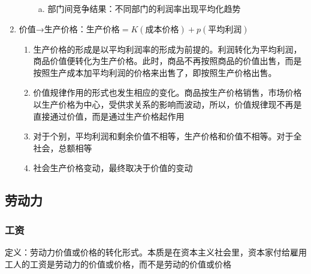 \documentclass[12pt]{book}
\begin{document}
\begin{enumerate}[1.]
\begin{enumerate}[(1)]
\begin{enumerate}[a.]
                        \item 部门间竞争结果：不同部门的利润率出现平均化趋势
                    \end{enumerate}
          \end{enumerate}
    \item 价值→生产价格：$\text{生产价格}=K(\text{成本价格})+p(\text{平均利润})$
          \begin{enumerate}[(1)]
              \item 生产价格的形成是以平均利润率的形成为前提的。利润转化为平均利润，商品价值便转化为生产价格。此时，商品不再按照商品的价值出售，而是按照生产成本加平均利润的价格来出售了，即按照生产价格出售。
              \item 价值规律作用的形式也发生相应的变化。商品按生产价格销售，市场价格以生产价格为中心，受供求关系的影响而波动，所以，价值规律现不再是直接通过价值，而是通过生产价格起作用
              \item  对于个别，平均利润和剩余价值不相等，生产价格和价值不相等。对于全社会，总额相等
              \item 社会生产价格变动，最终取决于价值的变动
          \end{enumerate}
\end{enumerate}






\subsection{劳动力}









\subsubsection{工资}
定义：劳动力价值或价格的转化形式。本质是在资本主义社会里，资本家付给雇用工人的工资是劳动力的价值或价格，而不是劳动的价值或价格
\end{document}
